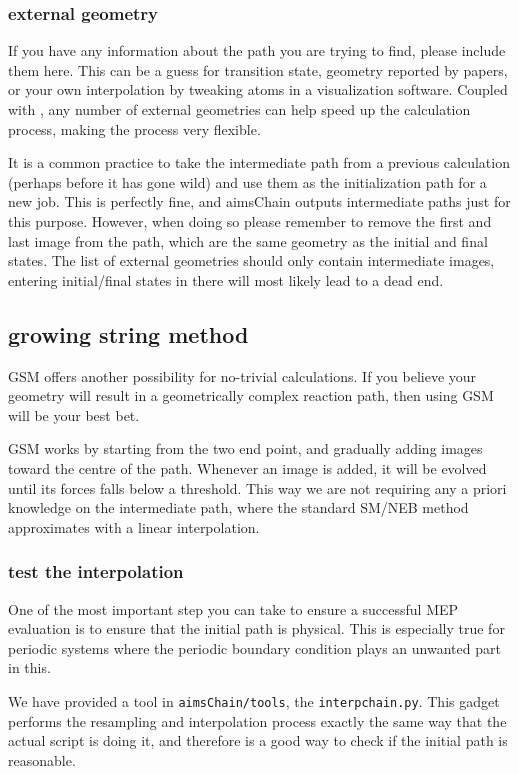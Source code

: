 \subsubsection*{external geometry}
If you have any information about the path you are trying to find, please include them here. This can be a guess for transition state, geometry reported by papers, or your own interpolation by tweaking atoms in a visualization software. Coupled with , any number of external geometries can help speed up the calculation process, making the process very flexible. 

It is a common practice to take the intermediate path from a previous calculation (perhaps before it has gone wild) and use them as the initialization path for a new job. This is perfectly fine, and aimsChain outputs intermediate paths just for this purpose. However, when doing so please remember to remove the first and last image from the path, which are the same geometry as the initial and final states. The list of external geometries should only contain intermediate images, entering initial/final states in there will most likely lead to a dead end. 
 
\subsection*{growing string method}
GSM  offers another possibility for no-trivial calculations. If you believe your geometry will result in a geometrically complex reaction path, then using GSM will be your best bet. 

GSM works by starting from the two end point, and gradually adding images toward the centre of the path. Whenever an image is added, it will be evolved until its forces falls below a threshold. This way we are not requiring any a priori knowledge on the intermediate path, where the standard SM/NEB method approximates with a linear interpolation.

\subsubsection*{test the interpolation}
One of the most important step you can take to ensure a successful MEP evaluation is to ensure that the initial path is physical. This is especially true for periodic systems where the periodic boundary condition plays an unwanted part in this. 

We have provided a tool in \texttt{aimsChain/tools}, the \texttt{interpchain.py}. This gadget performs the resampling and interpolation process exactly the same way that the actual script is doing it, and therefore is a good way to check if the initial path is reasonable. 

